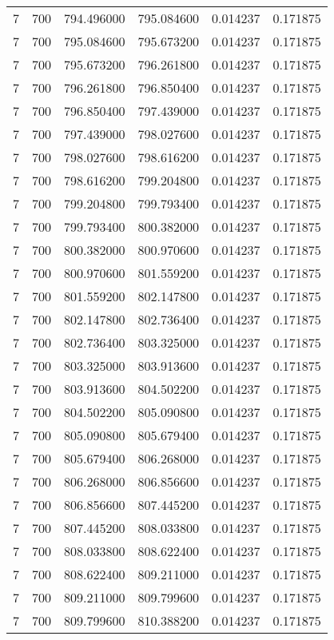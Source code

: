 \begin{longtable}{rrrrrr}
7 & 700 & 794.496000 & 795.084600 & 0.014237 & 0.171875 \\
7 & 700 & 795.084600 & 795.673200 & 0.014237 & 0.171875 \\
7 & 700 & 795.673200 & 796.261800 & 0.014237 & 0.171875 \\
7 & 700 & 796.261800 & 796.850400 & 0.014237 & 0.171875 \\
7 & 700 & 796.850400 & 797.439000 & 0.014237 & 0.171875 \\
7 & 700 & 797.439000 & 798.027600 & 0.014237 & 0.171875 \\
7 & 700 & 798.027600 & 798.616200 & 0.014237 & 0.171875 \\
7 & 700 & 798.616200 & 799.204800 & 0.014237 & 0.171875 \\
7 & 700 & 799.204800 & 799.793400 & 0.014237 & 0.171875 \\
7 & 700 & 799.793400 & 800.382000 & 0.014237 & 0.171875 \\
7 & 700 & 800.382000 & 800.970600 & 0.014237 & 0.171875 \\
7 & 700 & 800.970600 & 801.559200 & 0.014237 & 0.171875 \\
7 & 700 & 801.559200 & 802.147800 & 0.014237 & 0.171875 \\
7 & 700 & 802.147800 & 802.736400 & 0.014237 & 0.171875 \\
7 & 700 & 802.736400 & 803.325000 & 0.014237 & 0.171875 \\
7 & 700 & 803.325000 & 803.913600 & 0.014237 & 0.171875 \\
7 & 700 & 803.913600 & 804.502200 & 0.014237 & 0.171875 \\
7 & 700 & 804.502200 & 805.090800 & 0.014237 & 0.171875 \\
7 & 700 & 805.090800 & 805.679400 & 0.014237 & 0.171875 \\
7 & 700 & 805.679400 & 806.268000 & 0.014237 & 0.171875 \\
7 & 700 & 806.268000 & 806.856600 & 0.014237 & 0.171875 \\
7 & 700 & 806.856600 & 807.445200 & 0.014237 & 0.171875 \\
7 & 700 & 807.445200 & 808.033800 & 0.014237 & 0.171875 \\
7 & 700 & 808.033800 & 808.622400 & 0.014237 & 0.171875 \\
7 & 700 & 808.622400 & 809.211000 & 0.014237 & 0.171875 \\
7 & 700 & 809.211000 & 809.799600 & 0.014237 & 0.171875 \\
7 & 700 & 809.799600 & 810.388200 & 0.014237 & 0.171875 \\

\end{longtable}
